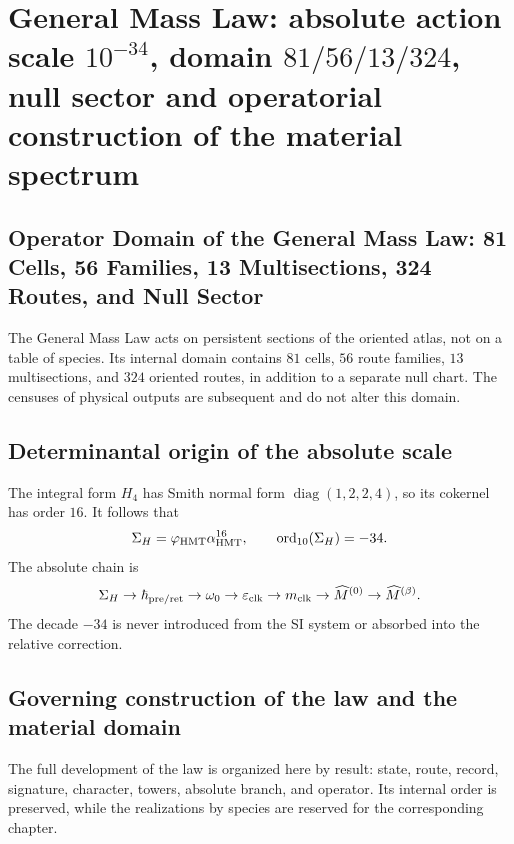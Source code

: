 \chapter{General Mass Law: absolute action scale \texorpdfstring{\(10^{-34}\)}{10⁻³⁴}, domain \texorpdfstring{\(81/56/13/324\)}{81/56/13/324}, null sector and operatorial construction of the material spectrum}
\label{chap:ley-general-masas-dominio-completo}

\section{Operator Domain of the General Mass Law: 81 Cells, 56 Families, 13 Multisections, 324 Routes, and Null Sector}
The General Mass Law acts on persistent sections of the oriented atlas, not on a table of species. Its internal domain contains \(81\) cells, \(56\) route families, \(13\) multisections, and \(324\) oriented routes, in addition to a separate null chart. The censuses of physical outputs are subsequent and do not alter this domain.

\section{Determinantal origin of the absolute scale}
The integral form \(H_4\) has Smith normal form
\(\operatorname{diag}(1,2,2,4)\), so its cokernel has order \(16\).
It follows that
\[
 \Sigma_H=\varphi_{\rm HMT}\alpha_{\rm HMT}^{16},
 \qquad \operatorname{ord}_{10}(\Sigma_H)=-34.
\]
The absolute chain is
\[
 \Sigma_H\to\hbar_{\rm pre/ret}\to\omega_0
 \to\varepsilon_{\rm clk}\to m_{\rm clk}
 \to\widehat M^{(0)}\to\widehat M^{(\beta)}.
\]
The decade \(-34\) is never introduced from the SI system or absorbed into the
relative correction.

\section{Governing construction of the law and the material domain}
The full development of the law is organized here by result: state, route,
record, signature, character, towers, absolute branch, and operator. Its internal order
is preserved, while the realizations by species are reserved for the corresponding
chapter.

